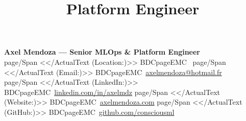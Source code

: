 \documentclass[10pt,a4paper,sans]{moderncv}
\title{Platform Engineer}
\newcommand{\labelicon}[2]{\pdfliteral page{/Span <</ActualText (#1:)>> BDC}#2\pdfliteral page{EMC}}
\begin{document}
\begin{center}
    {\fontsize{22}{26}\bfseries\color{color1}Axel Mendoza \color{color0}--- Senior MLOps \& Platform Engineer}\\[4pt]
    {\color{color2}
    \labelicon{Location}{\faMapMarker*}~\location\quad
    \labelicon{Email}{\faAt}~\href{mailto:axelmendoza@hotmail.fr}{axelmendoza@hotmail.fr}\\
    \labelicon{LinkedIn}{\faLinkedin}~\href{https://www.linkedin.com/in/axelmdz}{linkedin.com/in/axelmdz}\quad
    \labelicon{Website}{\faBlog}~\href{https://www.axelmendoza.com}{axelmendoza.com}\quad
    \labelicon{GitHub}{\faGithub}~\href{https://www.github.com/consciousml}{github.com/consciousml}}
\end{center}
\end{document}
